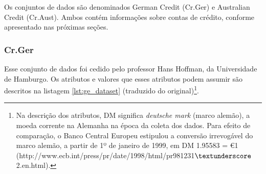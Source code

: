 Os conjuntos de dados são denominados German Credit (Cr.Ger) e Australian Credit (Cr.Aust). Ambos contém informações sobre contas de crédito, conforme apresentado nas próximas seções.

\subsubsection{Cr.Ger}

Esse conjunto de dados foi cedido pelo professor Hans Hoffman, da Universidade de Hamburgo. Os atributos e valores que esses atributos podem assumir são descritos na listagem \ref{lst:ge_dataset} (traduzido do original)\footnote{Na descrição dos atributos, DM significa \emph{deutsche mark} (marco alemão), a moeda corrente na Alemanha na época da coleta dos dados. Para efeito de comparação, o Banco Central Europeu estipulou a conversão irrevogável do marco alemão, a partir de 1º de janeiro de 1999, em DM 1.95583 = \euro 1 (http://www.ecb.int/press/pr/date/1998/html/pr981231$\textunderscore$2.en.html).}.

